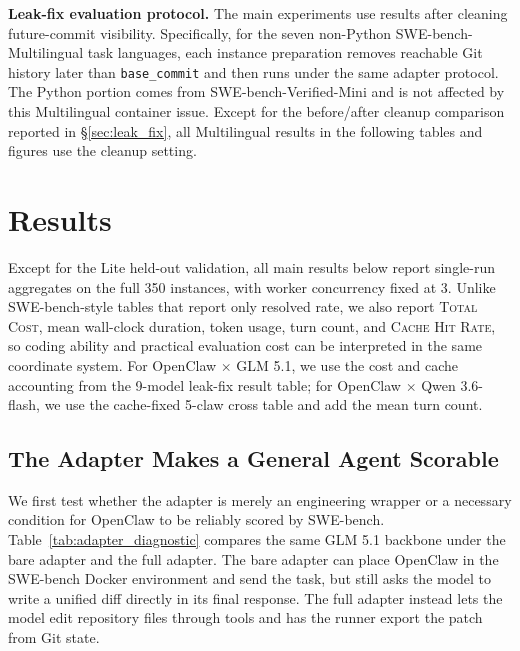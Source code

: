 \documentclass{llmxive}
\begin{document}
\textbf{Leak-fix evaluation protocol.}
The main experiments use results after cleaning future-commit visibility. Specifically, for the seven non-Python SWE-bench-Multilingual task languages, each instance preparation removes reachable Git history later than \texttt{base\_commit} and then runs under the same adapter protocol. The Python portion comes from SWE-bench-Verified-Mini and is not affected by this Multilingual container issue. Except for the before/after cleanup comparison reported in \S\ref{sec:leak_fix}, all Multilingual results in the following tables and figures use the cleanup setting.


\section{Results}\label{sec:results}

Except for the Lite held-out validation, all main results below report single-run aggregates on the full 350 instances, with worker concurrency fixed at 3. Unlike SWE-bench-style tables that report only resolved rate, we also report \textsc{Total Cost}, mean wall-clock duration, token usage, turn count, and \textsc{Cache Hit Rate}, so coding ability and practical evaluation cost can be interpreted in the same coordinate system. For OpenClaw $\times$ GLM 5.1, we use the cost and cache accounting from the 9-model leak-fix result table; for OpenClaw $\times$ Qwen 3.6-flash, we use the cache-fixed 5-claw cross table and add the mean turn count.

\subsection{The Adapter Makes a General Agent Scorable}\label{sec:adapter_diagnostic}

We first test whether the adapter is merely an engineering wrapper or a necessary condition for OpenClaw to be reliably scored by SWE-bench. Table~\ref{tab:adapter_diagnostic} compares the same GLM 5.1 backbone under the bare adapter and the full adapter. The bare adapter can place OpenClaw in the SWE-bench Docker environment and send the task, but still asks the model to write a unified diff directly in its final response. The full adapter instead lets the model edit repository files through tools and has the runner export the patch from Git state.
\end{document}
